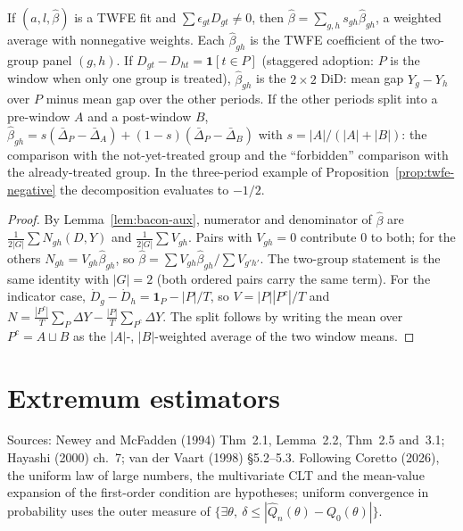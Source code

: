 \begin{theorem}
\label{thm:goodman-bacon}
\leanok
{}
If $(a,l,\hat\beta)$ is a TWFE fit and $\sum\epsilon_{gt}D_{gt}\ne 0$, then $\hat\beta = \sum_{g,h}s_{gh}\hat\beta_{gh}$, a
weighted average with nonnegative weights. Each $\hat\beta_{gh}$ is the TWFE coefficient of the two-group panel
$(g,h)$. If $D_{gt}-D_{ht} = \mathbf 1[t\in P]$ (staggered adoption: $P$ is the window when only one group is treated),
$\hat\beta_{gh}$ is the $2\times2$ DiD: mean gap $Y_g - Y_h$ over $P$ minus mean gap over the other periods. If the
other periods split into a pre-window $A$ and a post-window $B$, $\hat\beta_{gh} = s(\bar\Delta_P - \bar\Delta_A) +
(1-s)(\bar\Delta_P - \bar\Delta_B)$ with $s = |A|/(|A|+|B|)$: the comparison with the not-yet-treated group and the
``forbidden'' comparison with the already-treated group. In the
three-period example of Proposition~\ref{prop:twfe-negative} the decomposition evaluates to $-1/2$.
\end{theorem}
\begin{proof}
\leanok
By Lemma~\ref{lem:bacon-aux}, numerator and denominator of $\hat\beta$ are $\frac1{2|G|}\sum N_{gh}(D,Y)$ and
$\frac1{2|G|}\sum V_{gh}$. Pairs with $V_{gh}=0$ contribute $0$ to both; for the others
$N_{gh} = V_{gh}\hat\beta_{gh}$, so $\hat\beta = \sum V_{gh}\hat\beta_{gh}/\sum V_{g'h'}$. The two-group statement is
the same identity with $|G| = 2$ (both ordered pairs carry the same term). For the indicator case,
$\dot D_g - \dot D_h = \mathbf 1_P - |P|/T$, so $V = |P||P^c|/T$ and $N = \frac{|P^c|}{T}\sum_P\Delta Y -
\frac{|P|}{T}\sum_{P^c}\Delta Y$. The split follows by writing the mean over $P^c = A\sqcup B$ as the
$|A|$-, $|B|$-weighted average of the two window means.
\end{proof}

\section{Extremum estimators}
\label{sec:extremum}

Sources: Newey and McFadden (1994) Thm~2.1, Lemma~2.2, Thm~2.5 and~3.1; Hayashi (2000) ch.~7; van der Vaart (1998)
\S5.2--5.3. Following Coretto (2026), the uniform law of large numbers, the multivariate CLT and the mean-value
expansion of the first-order condition are hypotheses; uniform convergence in probability uses the outer measure of
$\{\exists\theta,\ \delta\le|\hat Q_n(\theta)-Q_0(\theta)|\}$.


